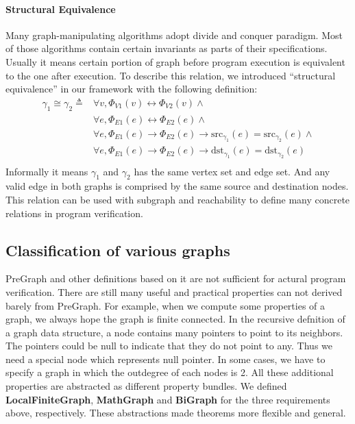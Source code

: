\paragraph{Structural Equivalence}
Many graph-manipulating algorithms adopt divide and conquer
paradigm. Most of those algorithms contain certain invariants as parts
of their specifications. Usually it means certain portion of graph
before program execution is equivalent to the one after execution. To
describe this relation, we introduced ``structural equivalence'' in
our framework with the following definition:
\begin{equation*}
\begin{split}
\gamma_1 \cong\gamma_2 \triangleq & \forall v, \Phi_{V1}(v) \leftrightarrow \Phi_{V2}(v) \wedge \\
& \forall e, \Phi_{E1}(e) \leftrightarrow \Phi_{E2}(e) \wedge\\
& \forall e, \Phi_{E1}(e) \rightarrow \Phi_{E2}(e) \rightarrow \text{src}_{\gamma_1}(e)=\text{src}_{\gamma_2}(e) \wedge\\
& \forall e, \Phi_{E1}(e) \rightarrow \Phi_{E2}(e) \rightarrow \text{dst}_{\gamma_1}(e)=\text{dst}_{\gamma_2}(e)\\
\end{split}
\end{equation*}
Informally it means $\gamma_1$ and $\gamma_2$ has the same vertex set
and edge set. And any valid edge in both graphs is comprised by the
same source and destination nodes. This relation can be used with
subgraph and reachability to define many concrete relations in program
verification.

\subsection{Classification of various graphs}

PreGraph and other definitions based on it are not sufficient for
actural program verification. There are still many useful and
practical properties can not derived barely from PreGraph. For
example, when we compute some properties of a graph, we always hope
the graph is finite connected. In the recursive defnition of a graph
data structure, a node contains many pointers to point to its
neighbors. The pointers could be null to indicate that they do not
point to any. Thus we need a special node which represents null
pointer. In some cases, we have to specify a graph in which the
outdegree of each nodes is 2. All these additional properties are
abstracted as different property bundles. We
defined \textbf{LocalFiniteGraph}, \textbf{MathGraph}
and \textbf{BiGraph} for the three requirements above,
respectively. These abstractions made theorems more flexible and
general.

